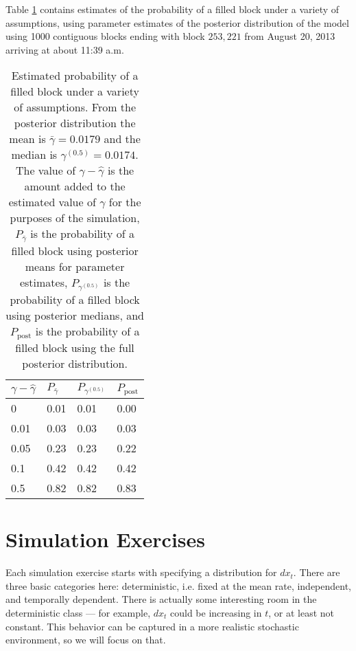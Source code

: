 \documentclass{article}
\begin{document}
Table \ref{tab:probsims} contains estimates of the probability of a filled block under a variety of assumptions, using parameter estimates of the posterior distribution of the model using 1000 contiguous blocks ending with block $253,221$ from August 20, 2013 arriving at about 11:39 a.m.
\begin{table}[ht]
\centering
\begin{tabular}{llll}
  \hline
$\gamma - \hat{\gamma}$ & $P_{\bar{\gamma}}$ & $P_{\gamma^{(0.5)}}$ & $P_{\mathrm{post}}$ \\ 
  \hline
0 & 0.01 & 0.01 & 0.00 \\ 
  0.01 & 0.03 & 0.03 & 0.03 \\ 
  0.05 & 0.23 & 0.23 & 0.22 \\ 
  0.1 & 0.42 & 0.42 & 0.42 \\ 
  0.5 & 0.82 & 0.82 & 0.83 \\ 
   \hline
\end{tabular}
\caption{Estimated probability of a filled block under a variety of assumptions. From the posterior distribution the mean is $\bar{\gamma} = 0.0179$ and the median is $\gamma^{(0.5)} = 0.0174$. The value of $\gamma - \hat{\gamma}$ is the amount added to the estimated value of $\gamma$ for the purposes of the simulation, $P_{\bar{\gamma}}$ is the probability of a filled block using posterior means for parameter estimates, $P_{\gamma^{(0.5)}}$ is the probability of a filled block using posterior medians, and $P_{\mathrm{post}}$ is the probability of a filled block using the full posterior distribution.}
\label{tab:probsims}
\end{table}

\section{Simulation Exercises}

Each simulation exercise starts with specifying a distribution for $dx_t$. There are three basic categories here: deterministic, i.e. fixed at the mean rate, independent, and temporally dependent. There is actually some interesting room in the deterministic class --- for example, $dx_t$ could be increasing in $t$, or at least not constant. This behavior can be captured in a more realistic stochastic environment, so we will focus on that. 
\end{document}
